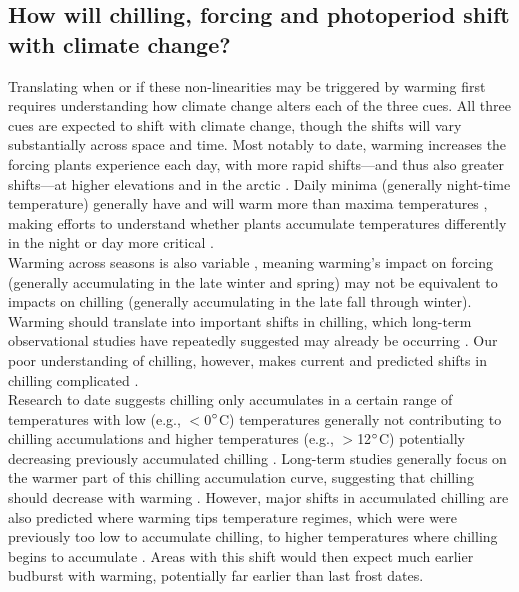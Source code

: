 \documentclass[11pt,letter]{article}
\begin{document}
\subsection{How will chilling, forcing and photoperiod shift with climate change?}
Translating when or if these non-linearities may be triggered by warming first requires understanding how climate change alters each of the three cues. All three cues are expected to shift with climate change, though the shifts will vary substantially across space and time. Most notably to date, warming increases the forcing plants experience each day, with more rapid shifts---and thus also greater shifts---at higher elevations and in the arctic \citep{IPCC:2014sm}. Daily minima (generally night-time temperature) generally have and will warm more than maxima temperatures \citep[though this effect varies spatially,][]{Alexander:2006qy}, making efforts to understand whether plants accumulate temperatures differently in the night or day more critical \citep{prasad2008,shen2018}. \\ 

Warming across seasons is also variable \citep{Alexander:2006qy}, meaning warming's impact on forcing (generally accumulating in the late winter and spring) may not be equivalent to impacts on chilling (generally accumulating in the late fall through winter). Warming should translate into important shifts in chilling, which long-term observational studies have repeatedly suggested may already be occurring \citep{fu2015,piao2017}.  Our poor understanding of chilling, however, makes current and predicted shifts in chilling complicated \citep{chuine2016}. \\

Research to date suggests chilling only accumulates in a certain range of temperatures with low (e.g., $<$0$\degree$C) temperatures generally not contributing to chilling accumulations and higher temperatures (e.g., $>$12$\degree$C) potentially decreasing previously accumulated chilling \citep[see Fig. \ref{fig:chilling} and][]{richardson1974,fishman1987}. Long-term studies generally focus on the warmer part of this chilling accumulation curve, suggesting that chilling should decrease with warming \citep{fu2015,piao2017,gauzere2019}.  However, major shifts in accumulated chilling are also predicted where warming tips temperature regimes, which were were previously too low to accumulate chilling, to higher temperatures where chilling begins to accumulate \citep{guy2014}. Areas with this shift would then expect much earlier budburst with warming, potentially far earlier than last frost dates. \\ %
\end{document}
